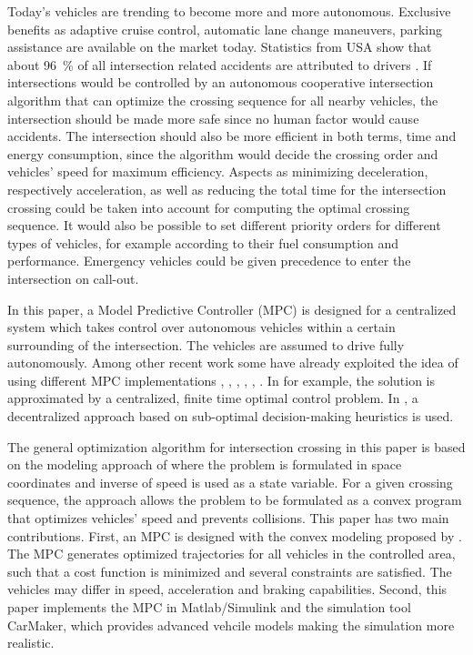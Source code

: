 \documentclass[letterpaper,10pt,conference]{ieeeconf}
\begin{document}
Today's vehicles are trending to become more and more autonomous. Exclusive benefits as adaptive cruise control, automatic lane change maneuvers, parking assistance are available on the market today. Statistics from USA show that about \SI{96}{\%} of all intersection related accidents are attributed to drivers \cite{nhtsa}. If intersections would be controlled by an autonomous cooperative intersection algorithm that can optimize the crossing sequence for all nearby vehicles, the intersection should be made more safe since no human factor would cause accidents. The intersection should also be more efficient in both terms, time and energy consumption, since the algorithm would decide the crossing order and vehicles' speed for maximum efficiency. Aspects as minimizing deceleration, respectively acceleration, as well as reducing the total time for the intersection crossing could be taken into account for computing the optimal crossing sequence. It would also be possible to set different priority orders for different types of vehicles, for example according to their fuel consumption and performance. Emergency vehicles could be given precedence to enter the intersection on call-out.

In this paper, a Model Predictive Controller (MPC) is designed for a centralized system which takes control over autonomous vehicles within a certain surrounding of the intersection. The vehicles are assumed to drive fully autonomously. Among other recent work some have already exploited the idea of using different MPC implementations \cite{eleven}, \cite{twelve}, \cite{thirteen}, \cite{fourteen}, \cite{fifteen}, \cite{nikolce}. In \cite{thirteen} for example, the solution is approximated by a centralized, finite time optimal control problem. In \cite{fourteen}, a decentralized approach based on sub-optimal decision-making heuristics is used.

The general optimization algorithm for intersection crossing in this paper is based on the modeling approach of \cite{nikolce} where the problem is formulated in space coordinates and inverse of speed is used as a state variable. For a given crossing sequence, the approach allows the problem to be formulated as a convex program that optimizes vehicles' speed and prevents collisions. This paper has two main contributions. First, an MPC is designed with the convex modeling proposed by \cite{nikolce}. The MPC generates optimized trajectories for all vehicles in the controlled area, such that a cost function is minimized and several constraints are satisfied. The vehicles may differ in speed, acceleration and braking capabilities. Second, this paper implements the MPC in Matlab/Simulink and the simulation tool CarMaker, which provides advanced vehcile models making the simulation more realistic.
\end{document}
